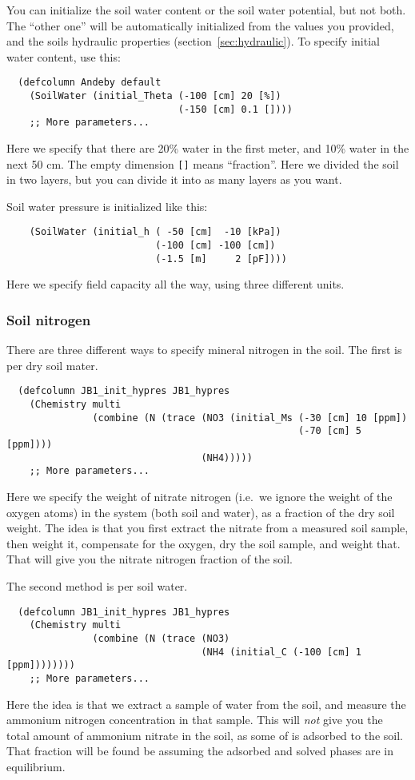 \documentclass[a4paper]{article}
\begin{document}
You can initialize the soil water content or the soil water potential,
but not both.  The ``other one'' will be automatically initialized
from the values you provided, and the soils hydraulic properties
(section~\ref{sec:hydraulic}).  To specify initial water content, use
this: 
\begin{verbatim}
  (defcolumn Andeby default
    (SoilWater (initial_Theta (-100 [cm] 20 [%])
                              (-150 [cm] 0.1 [])))
    ;; More parameters...
\end{verbatim}
Here we specify that there are 20\% water in the first meter, and
10\% water in the next 50 cm.  The empty dimension \verb|[]| means
``fraction''.  Here we divided the soil in two layers, but you can
divide it into as many layers as you want.  

Soil water pressure is initialized like this:
\begin{verbatim}
    (SoilWater (initial_h ( -50 [cm]  -10 [kPa])
                          (-100 [cm] -100 [cm])
                          (-1.5 [m]     2 [pF])))
\end{verbatim}
Here we specify field capacity all the way, using three different
units. 

\subsubsection{Soil nitrogen}

There are three different ways to specify mineral nitrogen in the
soil.  The first is per dry soil mater.  
\begin{verbatim}
  (defcolumn JB1_init_hypres JB1_hypres 
    (Chemistry multi
               (combine (N (trace (NO3 (initial_Ms (-30 [cm] 10 [ppm])
                                                   (-70 [cm] 5  [ppm])))
                                  (NH4)))))
    ;; More parameters...
\end{verbatim}
Here we specify the weight of nitrate nitrogen (i.e.\ we ignore the
weight of the oxygen atoms) in the system (both soil and water), as a
fraction of the dry soil weight.  The idea is that you first extract
the nitrate from a measured soil sample, then weight it, compensate for
the oxygen, dry the soil sample, and weight that.  That will give you
the nitrate nitrogen fraction of the soil.  

The second method is per soil water.
\begin{verbatim}
  (defcolumn JB1_init_hypres JB1_hypres 
    (Chemistry multi
               (combine (N (trace (NO3)
                                  (NH4 (initial_C (-100 [cm] 1 [ppm])))))))
    ;; More parameters...
\end{verbatim}
Here the idea is that we extract a sample of water from the soil, and
measure the ammonium nitrogen concentration in that sample.  This will
\emph{not} give you the total amount of ammonium nitrate in the soil,
as some of is adsorbed to the soil.  That fraction will be found be
assuming the adsorbed and solved phases are in equilibrium.
\end{document}
